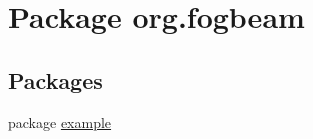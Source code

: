 \hypertarget{namespaceorg_1_1fogbeam}{}\section{Package org.\+fogbeam}
\label{namespaceorg_1_1fogbeam}
\subsection*{Packages}
\begin{DoxyCompactItemize}
\item 
package \hyperlink{namespaceorg_1_1fogbeam_1_1example}{example}
\end{DoxyCompactItemize}
